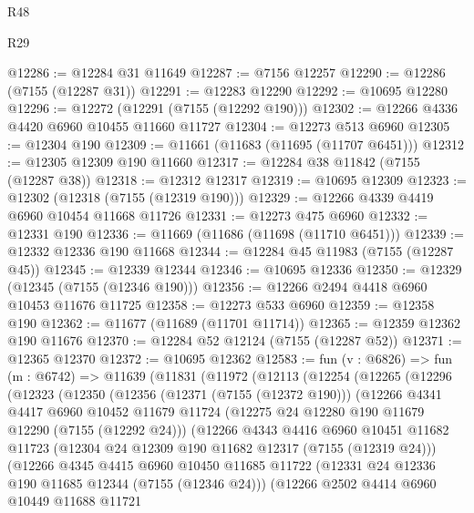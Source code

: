 \begin{lexlean}{R48}
\begin{lexlean}{R29}
\begin{coremodule}
{{{{{{{{{{{{{{{{{{{{{{{{{{{{{{{{{{{{{{{{{{{{{{{{{{{{{{{{{{{{{{{{{{{{{{{{{{{{{{{{{{{{{{{{{{{{{{{{{{{{{{{{{{{{{{{{{{{{{{{{{{{{{{{{{{{{{{{{{{{{{{{{{{{{{{{{{{{{{{{{{{{{{{{{{{{{{{{{{{{{{{{{{{{{{{{{{{{{{{{{{{{{{{{{{{{{{{{{{{@12286 := @12284 @31 @11649
@12287 := @7156 @12257
@12290 := @12286 (@7155 (@12287 @31))
@12291 := @12283 @12290
@12292 := @10695 @12280
@12296 := @12272 (@12291 (@7155 (@12292 @190)))
@12302 := @12266 @4336 @4420 @6960 @10455 @11660 @11727
@12304 := @12273 @513 @6960
@12305 := @12304 @190
@12309 := @11661 (@11683 (@11695 (@11707 @6451)))
@12312 := @12305 @12309 @190 @11660
@12317 := @12284 @38 @11842 (@7155 (@12287 @38))
@12318 := @12312 @12317
@12319 := @10695 @12309
@12323 := @12302 (@12318 (@7155 (@12319 @190)))
@12329 := @12266 @4339 @4419 @6960 @10454 @11668 @11726
@12331 := @12273 @475 @6960
@12332 := @12331 @190
@12336 := @11669 (@11686 (@11698 (@11710 @6451)))
@12339 := @12332 @12336 @190 @11668
@12344 := @12284 @45 @11983 (@7155 (@12287 @45))
@12345 := @12339 @12344
@12346 := @10695 @12336
@12350 := @12329 (@12345 (@7155 (@12346 @190)))
@12356 := @12266 @2494 @4418 @6960 @10453 @11676 @11725
@12358 := @12273 @533 @6960
@12359 := @12358 @190
@12362 := @11677 (@11689 (@11701 @11714))
@12365 := @12359 @12362 @190 @11676
@12370 := @12284 @52 @12124 (@7155 (@12287 @52))
@12371 := @12365 @12370
@12372 := @10695 @12362
@12583 := fun (v : @6826) =>
  fun (m : @6742) =>
  @11639
    (@11831
      (@11972
        (@12113
          (@12254
            (@12265
              (@12296
                (@12323
                  (@12350
                    (@12356
                      (@12371 (@7155 (@12372 @190)))
                      (@12266
                        @4341
                        @4417
                        @6960
                        @10452
                        @11679
                        @11724
                        (@12275 @24 @12280 @190 @11679 @12290 (@7155 (@12292 @24)))
                        (@12266
                          @4343
                          @4416
                          @6960
                          @10451
                          @11682
                          @11723
                          (@12304 @24 @12309 @190 @11682 @12317 (@7155 (@12319 @24)))
                          (@12266
                            @4345
                            @4415
                            @6960
                            @10450
                            @11685
                            @11722
                            (@12331 @24 @12336 @190 @11685 @12344 (@7155 (@12346 @24)))
                            (@12266
                              @2502
                              @4414
                              @6960
                              @10449
                              @11688
                              @11721
}}}}}}}}}}}}}}}}}}}}}}}}}}}}}}}}}}}}}}}}}}}}}}}}}}}}}}}}}}}}}}}}}}}}}}}}}}}}}}}}}}}}}}}}}}}}}}}}}}}}}}}}}}}}}}}}}}}}}}}}}}}}}}}}}}}}}}}}}}}}}}}}}}}}}}}}}}}}}}}}}}}}}}}}}}}}}}}}}}}}}}}}}}}}}}}}}}}}}}}}}}}}}}}}}}}}}}}}}}
\end{coremodule}
\end{lexlean}
\end{lexlean}
